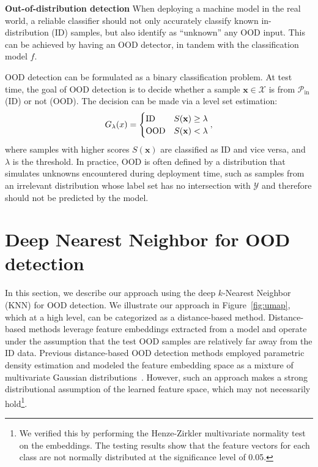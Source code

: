 \documentclass[nohyperref]{article}
\newcommand{\bx}{\mathbf{x}}
\newcommand{\method}{{KNN}}
\theoremstyle{plain}
\theoremstyle{definition}
\theoremstyle{remark}
\begin{document}
\textbf{Out-of-distribution detection} When deploying a machine model in the real world, {a reliable classifier should not only accurately classify known in-distribution (ID) samples, but also identify as ``unknown'' any OOD input}. This can be achieved by having an OOD detector, in tandem with the classification model $f$. 

OOD detection can be formulated as a binary classification problem. At test time, the goal of OOD detection is to decide whether a sample $\bx \in \mathcal{X}$ is from $\mathcal{P}_\text{in}$ (ID) or not (OOD). The decision can be made via a level set estimation:
\vspace{-0.1cm}
\begin{align*}
\label{eq:threshold}
	G_{\lambda}(\*x)=\begin{cases} 
      \text{ID} & S(\bx)\ge \lambda \\
      \text{OOD} & S(\bx) < \lambda 
   \end{cases},
\end{align*}
where samples with higher scores $S(\bx)$ are classified as ID and vice versa, and  $\lambda$ is the threshold. In practice, OOD is often defined by a distribution that simulates unknowns encountered during deployment time, such as samples from an irrelevant distribution {whose label set has no intersection with $\mathcal{Y}$ and therefore should not be predicted by the model}.




\section{Deep Nearest Neighbor for OOD detection}
\label{sec:knn}

In this section, we describe our approach using the deep $k$-Nearest Neighbor (\method) for OOD detection. We illustrate our approach in Figure~\ref{fig:umap}, which at a high level, can be categorized as a distance-based method. Distance-based methods leverage feature embeddings
extracted from a model and operate under the assumption that the test OOD samples are relatively far away from the ID data. Previous distance-based OOD detection methods employed parametric density estimation and modeled the feature embedding space as a mixture of multivariate Gaussian distributions~\citep{lee2018simple}. However, such an approach makes a strong distributional assumption of the learned feature space, which may not necessarily hold\footnote{We verified this by performing the Henze-Zirkler multivariate normality test~\citep{henze1990class} on the embeddings. The testing results show that the feature vectors for each class are not normally distributed at the significance level of 0.05.}. 
\end{document}
